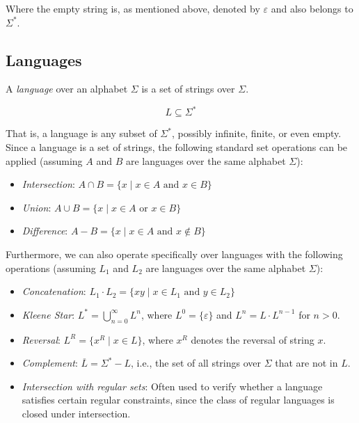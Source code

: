 Where the empty string is, as mentioned above, denoted by $\varepsilon$ and also belongs to $\Sigma^*$.

\subsection*{Languages}

A \emph{language} over an alphabet $\Sigma$ is a set of strings over $\Sigma$.

\[
L \subseteq \Sigma^*
\]

That is, a language is any subset of $\Sigma^*$, possibly infinite, finite, or even empty. \newline
Since a language is a set of strings, the following standard set operations can be applied (assuming $A$ and $B$ are languages over the same alphabet $\Sigma$):

\begin{itemize}
	\item \emph{Intersection}: $A \cap B = \{ x \mid x \in A \text{ and } x \in B \}$
	\item \emph{Union}: $A \cup B = \{ x \mid x \in A \text{ or } x \in B \}$
	\item \emph{Difference}: $A - B = \{ x \mid x \in A \text{ and } x \notin B \}$
\end{itemize}

Furthermore, we can also operate specifically over languages with the following operations (assuming $L_1$ and $L_2$ are languages over the same alphabet $\Sigma$):

\begin{itemize}
	\item \emph{Concatenation}: $L_1 \cdot L_2 = \{ xy \mid x \in L_1 \text{ and } y \in L_2 \}$
	\item \emph{Kleene Star}: $L^* = \bigcup_{n=0}^{\infty} L^n$, where $L^0 = \{\varepsilon\}$ and $L^n = L \cdot L^{n-1}$ for $n > 0$.
	\item \emph{Reversal}: $L^R = \{ x^R \mid x \in L \}$, where $x^R$ denotes the reversal of string $x$.
	\item \emph{Complement}: $\overline{L} = \Sigma^* - L$, i.e., the set of all strings over $\Sigma$ that are not in $L$.
	\item \emph{Intersection with regular sets}: Often used to verify whether a language satisfies certain regular constraints, since the class of regular languages is closed under intersection.
\end{itemize}

